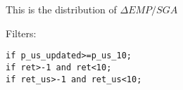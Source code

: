 





\thispagestyle{fancy}

\newcommand{\code}{\texttt}
\newcommand*{\Commonpath}{20190102}

This is the distribution of $\Delta EMP/SGA$

Filters:

\code{if p\_us\_updated>=p\_us\_10;} \\
\code{if ret>-1 and ret<10;} \\
\code{if ret\_us>-1 and ret\_us<10;} \\





